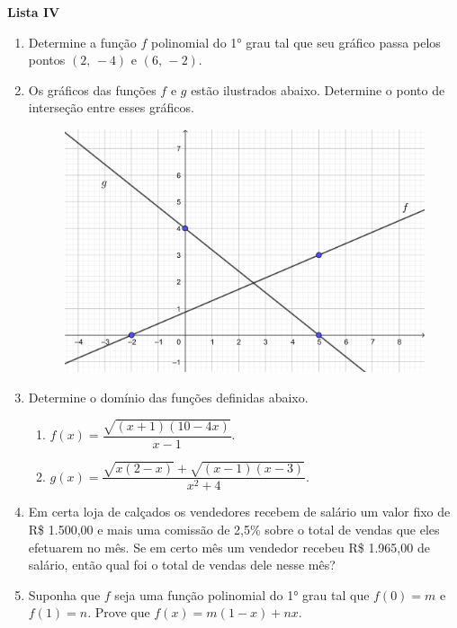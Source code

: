 \documentclass[12pt,a4paper]{article}
\begin{document}
\begin{center}
  \textbf{Lista IV}
\end{center}

\begin{enumerate}
  \item Determine a função $f$ polinomial do 1° grau tal que seu gráfico passa
  pelos pontos $(2,\,-4)$ e $(6,\,-2)$.
  
  \item Os gráficos das funções $f$ e $g$ estão ilustrados abaixo. Determine o
  ponto de interseção entre esses gráficos.
  
    \begin{figure}[H]
     \centering
     \includegraphics[scale=0.75]{figura/grafico-lista-iv-21-1.png}
    \end{figure}

  \item Determine o domínio das funções definidas abaixo.
  \begin{enumerate}
    \item $f(x) = \dfrac{\sqrt{(x + 1)(10 - 4x)}}{x - 1}$.
    \item $g(x) = \dfrac{\sqrt{x(2 - x)} + \sqrt{(x - 1)(x - 3)}}{x^2 + 4}$.
  \end{enumerate}
  
  \item Em certa loja de calçados os vendedores recebem de salário 
  um valor fixo de R\$ 1.500,00 e mais uma comissão de 2,5\% sobre o total de
  vendas que eles efetuarem no mês. Se em certo mês um vendedor recebeu
  R\$ 1.965,00 de salário, então qual foi o total de vendas dele nesse mês?
  
  \item Suponha que $f$ seja uma função polinomial do 1° grau tal que
  $f(0) = m$ e $f(1) = n$. Prove que $f(x) = m(1 - x) + nx$.

\end{enumerate}
\end{document}
